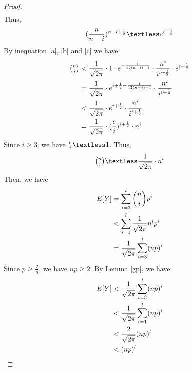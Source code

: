 \begin{proof}
\begin{align}
\end{align}
Thus, 
\begin{align}
    (\frac{n}{n-i})^{n-i+\frac{1}{2}} \textless e^{i+\frac{1}{2}}\label{c}
\end{align}
By inequation \ref{a}, \ref{b} and \ref{c} we have:
\begin{align}
\nonumber \tbinom{n}{i} &\textless \frac{1}{\sqrt{2\pi}}\cdot 1\cdot e^{-\frac{1}{12(n-i)-1}} \cdot \frac{n^i}{i^{i+\frac{1}{2}}} \cdot e^{i+\frac{1}{2}}\\
\nonumber &= \frac{1}{\sqrt{2\pi}}\cdot e^{i+\frac{1}{2}-\frac{1}{12(n-i)-1}} \cdot \frac{n^i}{i^{i+\frac{1}{2}}}\\
\nonumber &\textless \frac{1}{\sqrt{2\pi}}\cdot e^{i+\frac{1}{2}} \cdot \frac{n^i}{i^{i+\frac{1}{2}}}\\
\nonumber &= \frac{1}{\sqrt{2\pi}}\cdot (\frac{e}{i})^{i+\frac{1}{2}}\cdot n^i
\end{align}
Since $i\ge 3$, we have $\frac{e}{i}\textless 1$. Thus,
\begin{align}
    \nonumber \tbinom{n}{i} \textless \frac{1}{\sqrt{2\pi}}\cdot n^i
\end{align}
Then, we have
\begin{align}
    \nonumber E[Y] &= \sum_{i = 3}^{l}{\binom{n}{i} p^i} 
    \\
    \nonumber &\textless \sum_{i=1}^{l}\frac{1}{\sqrt{2\pi}}n^ip^i\\
    \nonumber &= \frac{1}{\sqrt{2\pi}}\sum_{i=3}^{l}(np)^i
\end{align}
Since $p \ge \frac{2}{n}$, we have $np\ge 2$.
By Lemma \ref{gp}, we have:
\begin{align}
    \nonumber E[Y]& \textless   \frac{1}{\sqrt{2\pi}}\sum_{i=3}^{l}(np)^i \\
    \nonumber & \textless \frac{1}{\sqrt{2\pi}}\sum_{i=1}^{l}(np)^i \\
    \nonumber & \textless \frac{2}{\sqrt{2\pi}}(np)^l\\
    \nonumber & \textless (np)^l
\end{align}


\end{proof}
